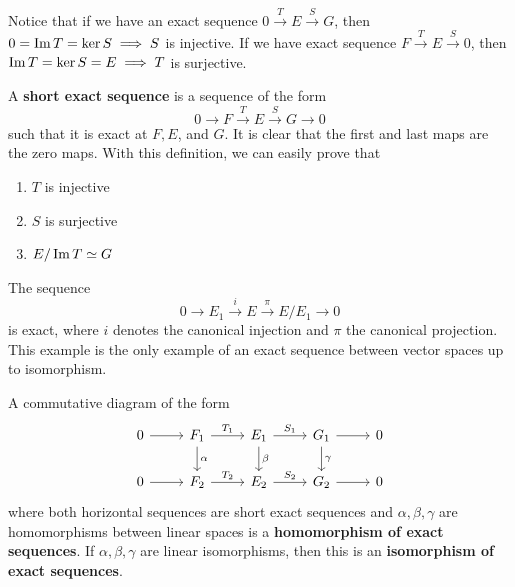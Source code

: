   Notice that if we have an exact sequence $0 \xrightarrow{T} E \xrightarrow{S} G$, then $0 = \operatorname{Im}{T} = \ker{S} \implies S$ is injective. If we have exact sequence $F \xrightarrow{T} E \xrightarrow{S} 0$, then $\operatorname{Im}{T} = \ker{S} = E \implies T$ is surjective. 

  \begin{definition}
    A \textbf{short exact sequence} is a sequence of the form
    \begin{equation}
      0 \xrightarrow{} F \xrightarrow{T} E \xrightarrow{S} G \xrightarrow{} 0
    \end{equation}
    such that it is exact at $F, E$, and $G$. It is clear that the first and last maps are the zero maps. With this definition, we can easily prove that
    \begin{enumerate}
      \item $T$ is injective
      \item $S$ is surjective
      \item $E / \operatorname{Im}{T} \simeq G$
    \end{enumerate}
  \end{definition}

  \begin{example}
    The sequence 
    \begin{equation}
      0 \xrightarrow{} E_1 \xrightarrow{i} E \xrightarrow{\pi} E / E_1 \xrightarrow{} 0
    \end{equation}
    is exact, where $i$ denotes the canonical injection and $\pi$ the canonical projection. This example is the only example of an exact sequence between vector spaces up to isomorphism. 
  \end{example}

  \begin{definition}
    A commutative diagram of the form
    \[\begin{tikzcd}
        0 \arrow{r} & F_1 \arrow{d}{\alpha} \arrow{r}{T_1} & E_1 \arrow{d}{\beta} \arrow{r}{S_1} & G_1 \arrow{d}{\gamma} \arrow{r} & 0 \\
        0 \arrow{r} & F_2 \arrow{r}{T_2} & E_2 \arrow{r}{S_2} & G_2 \arrow{r} & 0 
    \end{tikzcd}\]
    where both horizontal sequences are short exact sequences and $\alpha, \beta, \gamma$ are homomorphisms between linear spaces is a \textbf{homomorphism of exact sequences}. If $\alpha, \beta, \gamma$ are linear isomorphisms, then this is an \textbf{isomorphism of exact sequences}. 
  \end{definition}

